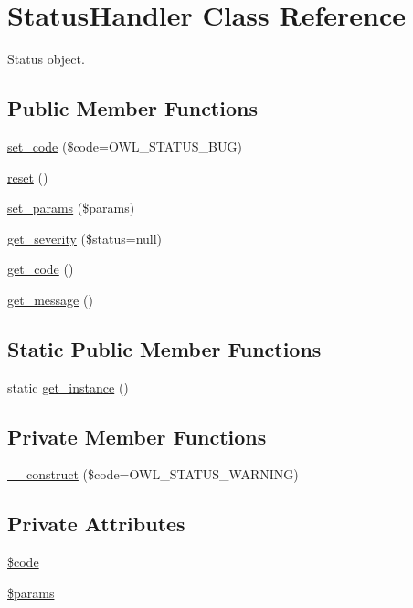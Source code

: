 \section{StatusHandler Class Reference}
\label{classStatusHandler}


Status object.  


\subsection*{Public Member Functions}
\begin{DoxyCompactItemize}
\item 
\hyperlink{classStatusHandler_a748d462386322a552aa798f951258c91}{set\_\-code} (\$code=OWL\_\-STATUS\_\-BUG)
\item 
\hyperlink{classStatusHandler_a8b0a327d3272ae49032a596518d47164}{reset} ()
\item 
\hyperlink{classStatusHandler_ac35544d3ad8a435f69db0965ed674428}{set\_\-params} (\$params)
\item 
\hyperlink{classStatusHandler_acadd0806c17eb02abcc92882e8588d4e}{get\_\-severity} (\$status=null)
\item 
\hyperlink{classStatusHandler_ad39bc4e6a56b6d418a252957da9b4417}{get\_\-code} ()
\item 
\hyperlink{classStatusHandler_a79170bca79bfd82e3f707e1294e7c916}{get\_\-message} ()
\end{DoxyCompactItemize}
\subsection*{Static Public Member Functions}
\begin{DoxyCompactItemize}
\item 
static \hyperlink{classStatusHandler_a9d291ccaa6b4e6eed931e47025915b0e}{get\_\-instance} ()
\end{DoxyCompactItemize}
\subsection*{Private Member Functions}
\begin{DoxyCompactItemize}
\item 
\hyperlink{classStatusHandler_a5cb2ad461aa4afc7ec9115c176eb354e}{\_\-\_\-construct} (\$code=OWL\_\-STATUS\_\-WARNING)
\end{DoxyCompactItemize}
\subsection*{Private Attributes}
\begin{DoxyCompactItemize}
\item 
\hyperlink{classStatusHandler_ab74e826d2401345eb20b11fe7d78aa45}{\$code}
\item 
\hyperlink{classStatusHandler_a599f9c9284340399fdcb7dac9cb7856f}{\$params}
\end{DoxyCompactItemize}
